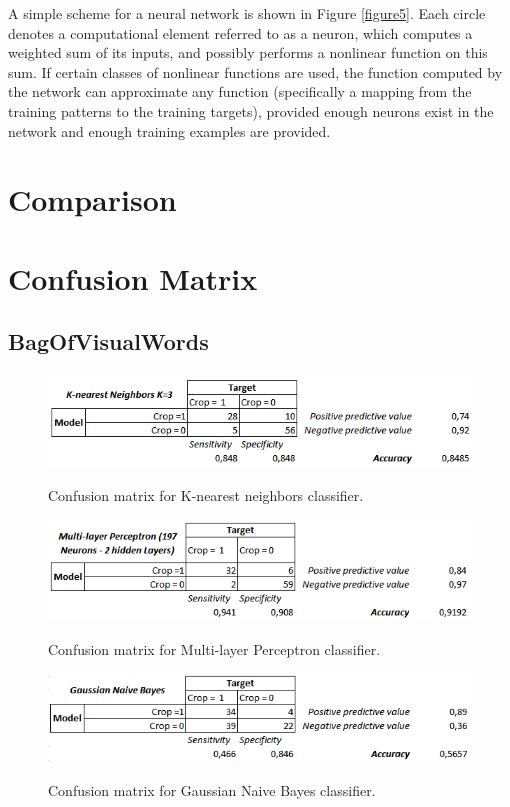 \documentclass[12pt]{article}
\numberwithin{equation}{section}
\numberwithin{table}{section}
\numberwithin{figure}{section}
\begin{document}
A simple scheme for a neural network is shown in Figure \ref{figure5}. Each circle denotes a computational element referred to as a neuron, which computes a weighted sum of its inputs, and possibly performs a nonlinear function on this sum. If certain classes of nonlinear functions are used, the function computed by the network can approximate any function (specifically a mapping from the training patterns to the training targets), provided enough neurons exist in the network and enough training examples are provided.



\section{Comparison} \label{Comparison}


\section{Confusion Matrix} \label{cmatrix}

\subsection{BagOfVisualWords}

\begin{figure}[H] \centering
	\caption{Confusion matrix for K-nearest neighbors classifier. }
	\includegraphics[width=1\textwidth]{m1.png}
	\label{m1}
\end{figure}

\begin{figure}[H] \centering
	\caption{Confusion matrix for Multi-layer Perceptron classifier. }
	\includegraphics[width=1\textwidth]{m2.png}
	\label{m2}
\end{figure}

\begin{figure}[H] \centering
	\caption{Confusion matrix for Gaussian Naive Bayes classifier. }
	\includegraphics[width=1\textwidth]{m3.png}
	\label{m3}
\end{figure}
\end{document}
